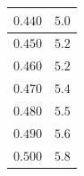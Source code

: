 \documentclass[letterpaper, 12pt]{article}
\begin{document}
\begin{longtable}{|c|c|}
    \hline
    $0.440$                                                                                                                                                                     & $5.0$                                                                                                                                                                                  \\
    \hline
    $0.450$                                                                                                                                                                     & $5.2$                                                                                                                                                                                  \\
    \hline
    $0.460$                                                                                                                                                                     & $5.2$                                                                                                                                                                                  \\
    \hline
    $0.470$                                                                                                                                                                     & $5.4$                                                                                                                                                                                  \\
    \hline
    $0.480$                                                                                                                                                                     & $5.5$                                                                                                                                                                                  \\
    \hline
    $0.490$                                                                                                                                                                     & $5.6$                                                                                                                                                                                  \\
    \hline
    $0.500$                                                                                                                                                                     & $5.8$                                                                                                                                                                                  \\

\end{longtable}
\end{document}
